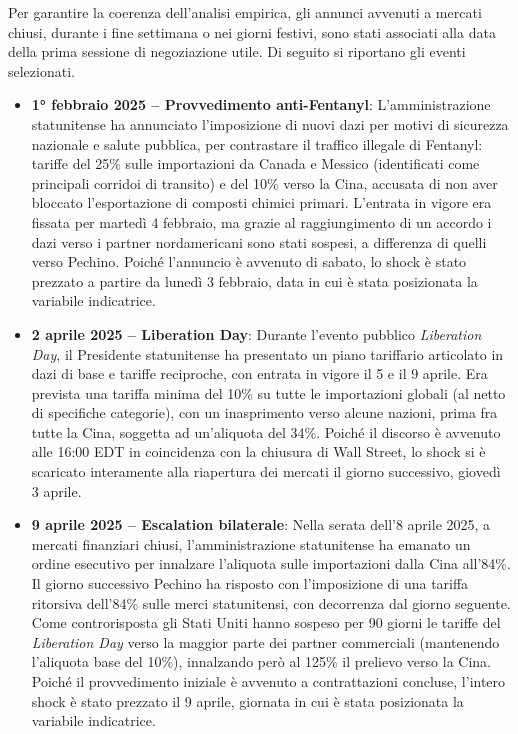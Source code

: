 Per garantire la coerenza dell'analisi empirica, gli annunci avvenuti a mercati chiusi, durante i fine settimana o nei giorni festivi, sono stati associati alla data della 
prima sessione di negoziazione utile. Di seguito si riportano gli eventi selezionati.

\begin{itemize}

\item \textbf{1° febbraio 2025 -- Provvedimento anti-Fentanyl}: L'amministrazione statunitense ha annunciato l'imposizione di nuovi dazi per motivi di sicurezza nazionale e salute pubblica, per contrastare il traffico illegale di 
Fentanyl: tariffe del 25\% sulle importazioni da Canada e Messico (identificati come principali corridoi di transito) e 
del 10\% verso la Cina, accusata di non aver bloccato l'esportazione di composti chimici primari. L'entrata in vigore era fissata per martedì 4 febbraio, ma grazie al 
raggiungimento di un accordo i dazi verso i partner nordamericani sono stati sospesi, a differenza di quelli verso Pechino\cite{whitehouse:fentanyl}. Poiché l'annuncio è avvenuto di sabato, 
lo shock è stato prezzato a partire da lunedì 3 febbraio, data in cui è stata posizionata la variabile indicatrice.

\item \textbf{2 aprile 2025 -- Liberation Day}: Durante l'evento pubblico \emph{Liberation Day}, il Presidente statunitense ha presentato un piano tariffario articolato in dazi di base e tariffe reciproche, 
con entrata in vigore il 5 e il 9 aprile. Era prevista una tariffa minima del 10\% su tutte le importazioni globali (al netto di specifiche categorie), con un inasprimento 
verso alcune nazioni, prima fra tutte la Cina, soggetta ad un'aliquota del 34\%\cite{whitecase:liberation}. Poiché il discorso è avvenuto alle 16:00 EDT in coincidenza con la chiusura di Wall Street, lo shock si è scaricato interamente alla riapertura 
dei mercati il giorno successivo, giovedì 3 aprile.

\item \textbf{9 aprile 2025 -- Escalation bilaterale}: Nella serata dell'8 aprile 2025, a mercati finanziari chiusi, l'amministrazione statunitense ha emanato un ordine esecutivo per innalzare l'aliquota sulle importazioni 
dalla Cina all'84\%. Il giorno successivo Pechino ha risposto con l'imposizione di una tariffa ritorsiva dell'84\% sulle merci 
statunitensi, con decorrenza dal giorno seguente. Come controrisposta gli Stati Uniti hanno sospeso per 90 giorni le tariffe del \emph{Liberation Day} verso la maggior 
parte dei partner commerciali (mantenendo l'aliquota base del 10\%), innalzando però al 125\% il prelievo verso la Cina\cite{whitehouse:escalation}. 
Poiché il provvedimento iniziale è avvenuto a contrattazioni concluse, l'intero shock è stato prezzato il 9 aprile, giornata in cui è stata posizionata la variabile indicatrice.


\end{itemize}
